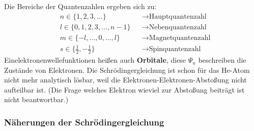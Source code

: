 \documentclass[12pt,a4paper,oneside,normalheadings,abstracton,liststotoc,bibtotoc,titlepage,pdftex]{scrartcl}
\begin{document}
Die Bereiche der Quantenzahlen ergeben sich zu:
\begin{align}
& n \in \{1, 2, 3, \dots \} && \rightarrow \text{Hauptquantenzahl}\\
& l \in \{0, 1, 2, 3, \dots, n-1\} && \rightarrow \text{Nebenquantenzahl}\\
& m \in \{-l, \dots, 0, \dots, l\} && \rightarrow \text{Magnetquantenzahl}\\
& s \in \{\frac{1}{2}, -\frac{1}{2}\} && \rightarrow \text{Spinquantenzahl}
\end{align}
Einelektronenwellefunktionen heißen auch \textbf{Orbitale}, diese $\Psi_n$ beschreiben die Zustände von Elektronen. Die Schrödingergleichung ist schon für das He-Atom nicht mehr analytisch lösbar, weil die Elektronen-Elektronen-Abstoßung nicht aufteilbar ist. (Die Frage welches Elektron wieviel zur Abstoßung beiträgt ist nicht beantwortbar.)

\subsubsection{Näherungen der Schrödingergleichung}
\end{document}
